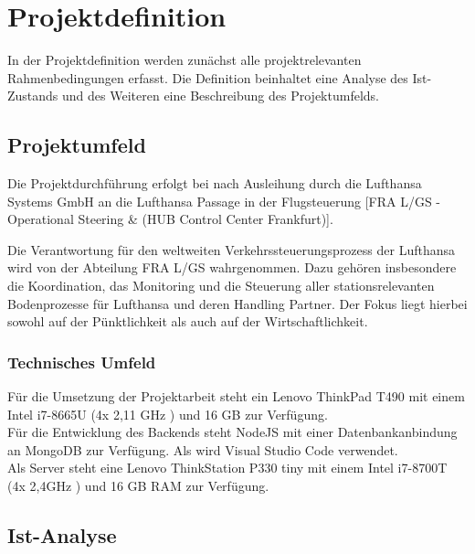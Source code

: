 \section{Projektdefinition}
	In der Projektdefinition werden zunächst alle projektrelevanten Rahmenbedingungen erfasst.
	Die Definition beinhaltet eine Analyse des Ist-Zustands und des Weiteren eine Beschreibung
	des Projektumfelds.

	\subsection{Projektumfeld}

		
		
		Die Projektdurchführung erfolgt bei nach Ausleihung durch die Lufthansa Systems GmbH an die Lufthansa Passage in der Flugsteuerung [FRA L/GS - Operational Steering \&  (HUB Control Center Frankfurt)].

		{
			\noindent
			Die Verantwortung für den weltweiten Verkehrssteuerungsprozess der Lufthansa wird von der
			Abteilung FRA L/GS wahrgenommen. Dazu gehören insbesondere die Koordination, das
			Monitoring und die Steuerung aller stationsrelevanten Bodenprozesse für Lufthansa und deren
			Handling Partner. Der Fokus liegt hierbei sowohl auf der Pünktlichkeit als auch auf der
			Wirtschaftlichkeit.
		}

		\subsubsection{Technisches Umfeld}
		{
			\noindent
			Für die Umsetzung der Projektarbeit steht ein Lenovo ThinkPad T490 mit einem Intel i7-8665U (4x 2,11 GHz ) und 16 GB   zur Verfügung.\\
			Für die Entwicklung des Backends steht NodeJS mit einer Datenbankanbindung an MongoDB zur Verfügung. Als  wird Visual Studio Code verwendet.
		}
		\\
		{
			\noindent
			Als Server steht eine Lenovo ThinkStation P330 tiny mit einem Intel i7-8700T (4x 2,4GHz ) und 16 GB RAM zur Verfügung.\\
		}
		
		\newpage

		\subsection{Ist-Analyse}

